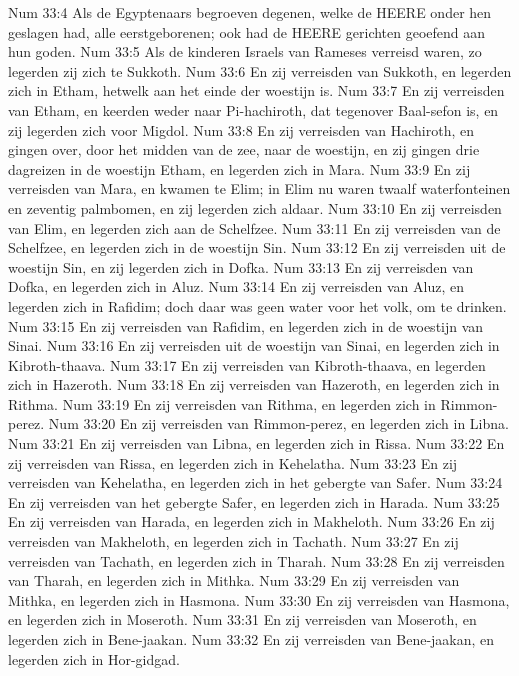 Num 33:4  Als de Egyptenaars begroeven degenen, welke de HEERE onder hen geslagen had, alle eerstgeborenen; ook had de HEERE gerichten geoefend aan hun goden.
Num 33:5  Als de kinderen Israels van Rameses verreisd waren, zo legerden zij zich te Sukkoth.
Num 33:6  En zij verreisden van Sukkoth, en legerden zich in Etham, hetwelk aan het einde der woestijn is.
Num 33:7  En zij verreisden van Etham, en keerden weder naar Pi-hachiroth, dat tegenover Baal-sefon is, en zij legerden zich voor Migdol.
Num 33:8  En zij verreisden van Hachiroth, en gingen over, door het midden van de zee, naar de woestijn, en zij gingen drie dagreizen in de woestijn Etham, en legerden zich in Mara.
Num 33:9  En zij verreisden van Mara, en kwamen te Elim; in Elim nu waren twaalf waterfonteinen en zeventig palmbomen, en zij legerden zich aldaar.
Num 33:10  En zij verreisden van Elim, en legerden zich aan de Schelfzee.
Num 33:11  En zij verreisden van de Schelfzee, en legerden zich in de woestijn Sin.
Num 33:12  En zij verreisden uit de woestijn Sin, en zij legerden zich in Dofka.
Num 33:13  En zij verreisden van Dofka, en legerden zich in Aluz.
Num 33:14  En zij verreisden van Aluz, en legerden zich in Rafidim; doch daar was geen water voor het volk, om te drinken.
Num 33:15  En zij verreisden van Rafidim, en legerden zich in de woestijn van Sinai.
Num 33:16  En zij verreisden uit de woestijn van Sinai, en legerden zich in Kibroth-thaava.
Num 33:17  En zij verreisden van Kibroth-thaava, en legerden zich in Hazeroth.
Num 33:18  En zij verreisden van Hazeroth, en legerden zich in Rithma.
Num 33:19  En zij verreisden van Rithma, en legerden zich in Rimmon-perez.
Num 33:20  En zij verreisden van Rimmon-perez, en legerden zich in Libna.
Num 33:21  En zij verreisden van Libna, en legerden zich in Rissa.
Num 33:22  En zij verreisden van Rissa, en legerden zich in Kehelatha.
Num 33:23  En zij verreisden van Kehelatha, en legerden zich in het gebergte van Safer.
Num 33:24  En zij verreisden van het gebergte Safer, en legerden zich in Harada.
Num 33:25  En zij verreisden van Harada, en legerden zich in Makheloth.
Num 33:26  En zij verreisden van Makheloth, en legerden zich in Tachath.
Num 33:27  En zij verreisden van Tachath, en legerden zich in Tharah.
Num 33:28  En zij verreisden van Tharah, en legerden zich in Mithka.
Num 33:29  En zij verreisden van Mithka, en legerden zich in Hasmona.
Num 33:30  En zij verreisden van Hasmona, en legerden zich in Moseroth.
Num 33:31  En zij verreisden van Moseroth, en legerden zich in Bene-jaakan.
Num 33:32  En zij verreisden van Bene-jaakan, en legerden zich in Hor-gidgad.
